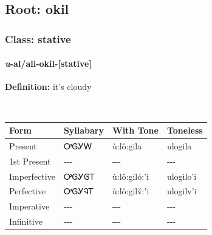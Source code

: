 \needspace{4in}
\subsection*{Root: okil}
\nopagebreak
{}
\needspace{3in}
\subsubsection*{Class: stative}
\nopagebreak
\needspace{2in}
\paragraph*{\textit{u}{-}al/ali{-}\textbf{okil}{-}[stative]}
\nopagebreak
\textbf{Definition: } it{\textquoteright}s cloudy
\\[0.5em]
\begin{tabularx}{\textwidth}{l X X X}%
\toprule%
\textbf{Form}&\textbf{Syllabary}&\textbf{With Tone}&\textbf{Toneless}\\%
\midrule%
Present&ᎤᎶᎩᎳ&ù:lô:gila&ulogila\\%
1st Present&{-}{-}{-}&{-}{-}{-}&{-}{-}{-}\\%
Imperfective&ᎤᎶᎩᎶᎢ&ù:lô:giló:’i&ulogilo’i\\%
Perfective&ᎤᎶᎩᎸᎢ&ù:lô:gilv̌:’i&ulogilv’i\\%
Imperative&{-}{-}{-}&{-}{-}{-}&{-}{-}{-}\\%
Infinitive&{-}{-}{-}&{-}{-}{-}&{-}{-}{-}\\%
\bottomrule%
\end{tabularx}
\\[1em]